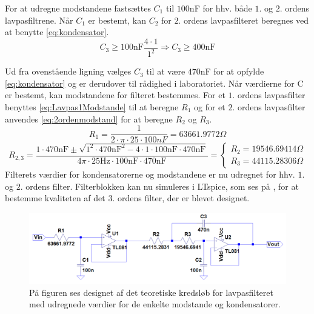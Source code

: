 \noindent For at udregne modstandene fastsættes $C_1$ til $100$nF for hhv. både $1$. og $2$. ordens lavpasfiltrene. Når $C_1$ er bestemt, kan $C_2$ for $2$. ordens lavpasfilteret beregnes ved at benytte \eqref{eq:kondensator}. %
\begin{equation}  
C_3 \geq 100\text{nF} \frac{4\cdot 1}{1^2} \Rightarrow C_3 \geq 400\text{nF}
\end{equation}

\noindent Ud fra ovenstående ligning vælges $C_3$ til at være $470$nF for at opfylde \eqref{eq:kondensator} og er derudover til rådighed i laboratoriet. Når værdierne for C er bestemt, kan modstandene for filteret bestemmes. For et $1$. ordens lavpasfilter benyttes \eqref{eq:Lavpas1Modstande} til at beregne $R_1$ og for et $2$. ordens lavpasfilter anvendes \eqref{eq:2ordenmodstand} for at beregne $R_2$ og $R_3$. 
\begin{equation} \label{eq:1ordenmodstand}
R_{1} = \frac{1}{2 \cdot \pi \cdot 25 \cdot 100nF} = 63661.9772 \Omega
\end{equation}
\begin{equation}
\label{eq:2ordenmodstand}R_{2,3} = \frac{1 \cdot 470\text{nF} \pm \sqrt{1^2 \cdot 470\text{nF}^2 - 4 \cdot 1 \cdot 100\text{nF} \cdot 470\text{nF}}}{4 \pi \cdot 25\text{Hz} \cdot 100\text{nF} \cdot 470\text{nF}} = \begin{cases} R_{2} = 19546.69414 \Omega \\ R_{3} =  44115.28306 \Omega \end{cases}
\end{equation}
\noindent Filterets værdier for kondensatorerne og modstandene er nu udregnet for hhv. $1$. og $2$. ordens filter. Filterblokken kan nu simuleres i LTspice, som ses på , for at bestemme kvaliteten af det $3$. ordens filter, der er blevet designet.

\begin{figure}[H]
	\centering
	\includegraphics[scale=0.35]{figures/cProblemloesning/Lavpasfilter1_LTspice.PNG}
	\caption{På figuren ses designet af det teoretiske kredsløb for lavpasfilteret med udregnede værdier for de enkelte modstande og kondensatorer.}
	\label{fig:lavpasfilter1_LTspice}
\end{figure}

